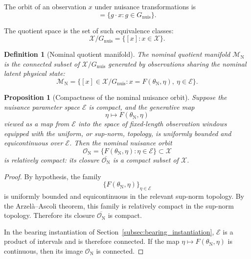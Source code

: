 \documentclass[11pt,letterpaper]{article}
\newtheorem{proposition}{Proposition}
\newtheorem{definition}{Definition}
\newcommand{\X}{\ensuremath{\mathcal{X}}}
\newcommand{\EtaSpace}{\ensuremath{\mathcal{E}}}
\newcommand{\Mnominal}{\ensuremath{\mathcal{M}_{\mathrm{N}}}}
\newcommand{\Gnuis}{\ensuremath{G_{\mathrm{nuis}}}}
\newcommand{\quotient}{\ensuremath{\mathcal{X}/G_{\mathrm{nuis}}}}
\begin{document}
The orbit of an observation \(x\) under nuisance transformations is
\begin{equation}
[x] = \{g \cdot x : g \in \Gnuis\}.
\label{eq:orbit}
\end{equation}

The quotient space is the set of such equivalence classes:
\begin{equation}
\quotient = \{[x] : x \in \X\}.
\label{eq:quotient}
\end{equation}

\begin{definition}[Nominal quotient manifold]
\label{def:nominal_quotient_manifold}
The nominal quotient manifold \(\Mnominal\) is the connected subset of \(\X/\Gnuis\) generated by observations sharing the nominal latent physical state:
\begin{equation}
\Mnominal
=
\{[x] \in \X/\Gnuis : x = F(\theta_{\mathrm{N}},\eta), \ \eta \in \EtaSpace\}.
\label{eq:nominal_manifold}
\end{equation}
\end{definition}

\begin{proposition}[Compactness of the nominal nuisance orbit]
\label{prop:compactness}
Suppose the nuisance parameter space \(\EtaSpace\) is compact, and the generative map
\[
\eta \mapsto F(\theta_{\mathrm N},\eta)
\]
viewed as a map from \(\EtaSpace\) into the space of fixed-length observation windows equipped with the uniform, or sup-norm, topology, is uniformly bounded and equicontinuous over \(\EtaSpace\).
Then the nominal nuisance orbit
\[
\mathcal{O}_{\mathrm N}
=
\{ F(\theta_{\mathrm N},\eta) : \eta \in \EtaSpace \}
\subset \X
\]
is relatively compact: its closure \(\overline{\mathcal{O}_{\mathrm N}}\) is a compact subset of \(\X\).
\end{proposition}

\begin{proof}
By hypothesis, the family
\[
\{F(\theta_{\mathrm N},\eta)\}_{\eta\in\EtaSpace}
\]
is uniformly bounded and equicontinuous in the relevant sup-norm topology.
By the Arzel\`a--Ascoli theorem, this family is relatively compact in the sup-norm topology.
Therefore its closure \(\overline{\mathcal{O}_{\mathrm N}}\) is compact.

In the bearing instantiation of Section~\ref{subsec:bearing_instantiation}, \(\EtaSpace\) is a product of intervals and is therefore connected.
If the map \(\eta\mapsto F(\theta_{\mathrm N},\eta)\) is continuous, then its image \(\mathcal{O}_{\mathrm N}\) is connected.
\end{proof}
\end{document}
